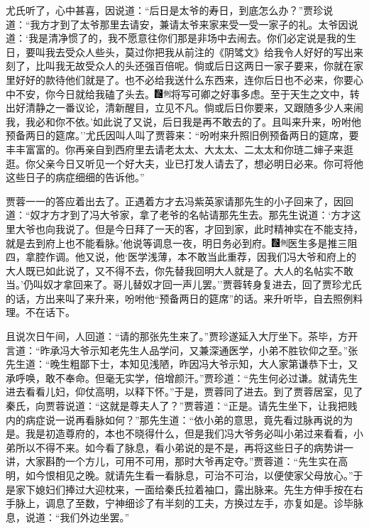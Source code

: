 尤氏听了，心中甚喜，因说道：``后日是太爷的寿日，到底怎么办？''贾珍说道：``我方才到了太爷那里去请安，兼请太爷来家来受一受一家子的礼。太爷因说道：`我是清净惯了的，我不愿意往你们那是非场中去闹去。你们必定说是我的生日，要叫我去受众人些头，莫过你把我从前注的《阴骘文》给我令人好好的写出来刻了，比叫我无故受众人的头还强百倍呢。倘或后日这两日一家子要来，你就在家里好好的款待他们就是了。也不必给我送什么东西来，连你后日也不必来，你要心中不安，你今日就给我磕了头去。{\includegraphics[width=3mm]{../Images/00006}\includegraphics[width=3mm]{../Images/00011}\footnotesize \kaishu 将写可卿之好事多虑。至于天生之文中，转出好清静之一番议论，清新醒目，立见不凡。}倘或后日你要来，又跟随多少人来闹我，我必和你不依。'如此说了又说，后日我是再不敢去的了。且叫来升来，吩咐他预备两日的筵席。''尤氏因叫人叫了贾蓉来：``吩咐来升照旧例预备两日的筵席，要丰丰富富的。你再亲自到西府里去请老太太、大太太、二太太和你琏二婶子来逛逛。你父亲今日又听见一个好大夫，业已打发人请去了，想必明日必来。你可将他这些日子的病症细细的告诉他。''

贾蓉一一的答应着出去了。正遇着方才去冯紫英家请那先生的小子回来了，因回道：``奴才方才到了冯大爷家，拿了老爷的名帖请那先生去。那先生说道：`方才这里大爷也向我说了。但是今日拜了一天的客，才回到家，此时精神实在不能支持，就是去到府上也不能看脉。'他说等调息一夜，明日务必到府。{\includegraphics[width=3mm]{../Images/00006}\includegraphics[width=3mm]{../Images/00011}\footnotesize \kaishu 医生多是推三阻四，拿腔作调。}他又说，他`医学浅薄，本不敢当此重荐，因我们冯大爷和府上的大人既已如此说了，又不得不去，你先替我回明大人就是了。大人的名帖实不敢当。'仍叫奴才拿回来了。哥儿替奴才回一声儿罢。''贾蓉转身复进去，回了贾珍尤氏的话，方出来叫了来升来，吩咐他``预备两日的筵席''的话。来升听毕，自去照例料理。不在话下。

且说次日午间，人回道：``请的那张先生来了。''贾珍遂延入大厅坐下。茶毕，方开言道：``昨承冯大爷示知老先生人品学问，又兼深通医学，小弟不胜钦仰之至。''张先生道：``晚生粗鄙下士，本知见浅陋，昨因冯大爷示知，大人家第谦恭下士，又承呼唤，敢不奉命。但毫无实学，倍增颜汗。''贾珍道：``先生何必过谦。就请先生进去看看儿妇，仰仗高明，以释下怀。''于是，贾蓉同了进去。到了贾蓉居室，见了秦氏，向贾蓉说道：``这就是尊夫人了？''贾蓉道：``正是。请先生坐下，让我把贱内的病症说一说再看脉如何？''那先生道：``依小弟的意思，竟先看过脉再说的为是。我是初造尊府的，本也不晓得什么，但是我们冯大爷务必叫小弟过来看看，小弟所以不得不来。如今看了脉息，看小弟说的是不是，再将这些日子的病势讲一讲，大家斟酌一个方儿，可用不可用，那时大爷再定夺。''贾蓉道：``先生实在高明，如今恨相见之晚。就请先生看一看脉息，可治不可治，以便使家父母放心。''于是家下媳妇们捧过大迎枕来，一面给秦氏拉着袖口，露出脉来。先生方伸手按在右手脉上，调息了至数，宁神细诊了有半刻的工夫，方换过左手，亦复如是。诊毕脉息，说道：``我们外边坐罢。''


